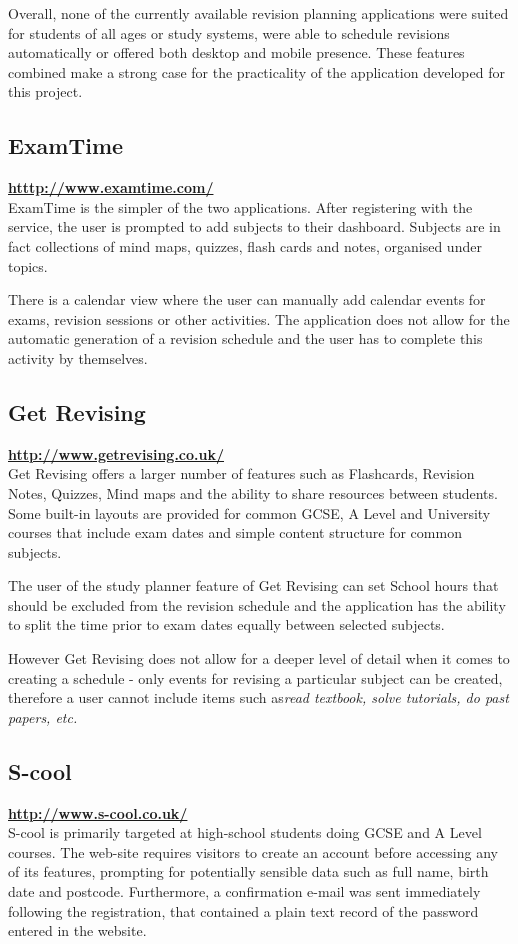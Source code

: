 \documentclass[bsc,frontabs,twoside,singlespacing,parskip]{infthesis}     %
\begin{document}
		Overall, none of the currently available revision planning applications were suited for students of all ages or study systems, were able to schedule revisions automatically or offered both desktop and mobile presence. These features combined make a strong case for the practicality of the application developed for this project.

		\subsection{ExamTime}
		\textbf{\hyperref[htttp://www.examtime.com/]{htttp://www.examtime.com/}}\\
		ExamTime is the simpler of the two applications. After registering with the service, the user is prompted to add subjects to their dashboard. Subjects are in fact collections of mind maps, quizzes, flash cards and notes, organised under topics.

		There is a calendar view where the user can manually add calendar events for exams, revision sessions or other activities. The application does not allow for the automatic generation of a revision schedule and the user has to complete this activity by themselves.

		\subsection{Get Revising}
		\textbf{\hyperref[http://www.getrevising.co.uk/]{http://www.getrevising.co.uk/}}\\
		Get Revising offers a larger number of features such as Flashcards, Revision Notes, Quizzes, Mind maps and the ability to share resources between students. Some built-in layouts are provided for common GCSE, A Level and University courses that include exam dates and simple content structure for common subjects.

		The user of the study planner feature of Get Revising can set School hours that should be excluded from the revision schedule and the application has the ability to split the time prior to exam dates equally between selected subjects.

		However Get Revising does not allow for a deeper level of detail when it comes to creating a schedule - only events for revising a particular subject can be created, therefore a user cannot include items such as\textit{read textbook, solve tutorials, do past papers, etc.}

		\subsection{S-cool}
		\textbf{\hyperref[http://www.s-cool.co.uk/]{http://www.s-cool.co.uk/}}\\
		S-cool is primarily targeted at high-school students doing GCSE and A Level courses. The web-site requires visitors to create an account before accessing any of its features, prompting for potentially sensible data such as full name, birth date and postcode. Furthermore, a confirmation e-mail was sent immediately following the registration, that contained a plain text record of the password entered in the website.
\end{document}
